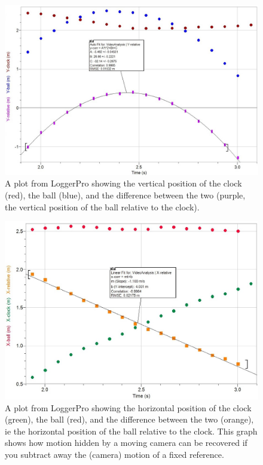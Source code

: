\documentclass[prb,twocolumn]{revtex4-2}
\begin{document}
\begin{figure}[h]
\centering
\includegraphics[width=\columnwidth]{Etkina-Y-T-plot.jpg}
\caption{
A plot from LoggerPro showing the vertical position of the clock (red), the ball (blue), and the difference between the two (purple, the vertical position of the ball relative to the clock).
}
\label{Etkina-Y-T-plot}
\end{figure}

\begin{figure}[h]
\centering
\includegraphics[width=\columnwidth]{Etkina-X-T-plot.jpg}
\caption{
A plot from LoggerPro showing the horizontal position of the clock (green), the ball (red), and the difference between the two (orange), ie the horizontal position of the ball relative to the clock.  This graph shows how motion hidden by a moving camera can be recovered if you subtract away the (camera) motion of a fixed reference.
}
\label{Etkina-X-T-plot}
\end{figure}
\end{document}

